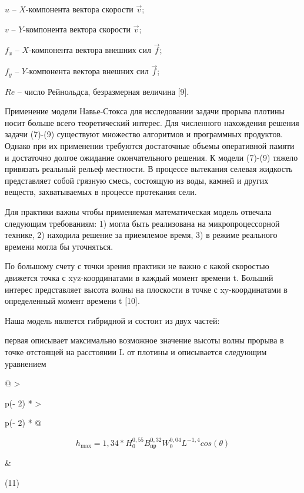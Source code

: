 \(u\) -- \(X\)-компонента вектора скорости \(\overrightarrow{v}\);

\(v\) -- \(Y\)-компонента вектора скорости \(\overrightarrow{v}\);

\(f_{x}\) -- \(X\)-компонента вектора внешних сил
\(\overrightarrow{f}\);

\(f_{y}\) -- \(Y\)-компонента вектора внешних сил
\(\overrightarrow{f}\);

\(Re\) -- число Рейнольдса, безразмерная величина {[}9{]}.

Применение модели Навье-Стокса для исследовании задачи прорыва плотины
носит больше всего теоретический интерес. Для численного нахождения
решения задачи (7)-(9) существуют множество алгоритмов и программных
продуктов. Однако при их применении требуются достаточные объемы
оперативной памяти и достаточно долгое ожидание окончательного решения.
К модели (7)-(9) тяжело привязать реальный рельеф местности. В процессе
вытекания селевая жидкость представляет собой грязную смесь, состоящую
из воды, камней и других веществ, захватываемых в процессе протекания
сели.

Для практики важны чтобы применяемая математическая модель отвечала
следующим требованиям: 1) могла быть реализована на микропроцессорной
технике, 2) находила решение за приемлемое время, 3) в режиме реального
времени могла бы уточняться.

По большому счету с точки зрения практики не важно с какой скоростью
движется точка с xyz-координатами в каждый момент времени t. Больший
интерес представляет высота волны на плоскости в точке с xy-координатами
в определенный момент времени t {[}10{]}.

Наша модель является гибридной и состоит из двух частей:

первая описывает максимально возможное значение высоты волны прорыва в
точке отстоящей на расстоянии L от плотины и описывается следующим
уравнением

\begin{longtable}[]{@{}
  >{\raggedright\arraybackslash}p{(\columnwidth - 2\tabcolsep) * }
  >{\raggedright\arraybackslash}p{(\columnwidth - 2\tabcolsep) * }@{}}
\toprule\noalign{}
\begin{minipage}[b]{\linewidth}\raggedright
\[h_{\max} = 1,34*H_{0}^{0,55}B_{пр}^{0,32}W_{0}^{0,04}L^{- 1,4}cos(\theta)\]
\end{minipage} & \begin{minipage}[b]{\linewidth}\raggedright
(11)
\end{minipage} \\
\midrule\noalign{}
\endhead
\bottomrule\noalign{}
\endlastfoot
\end{longtable}

